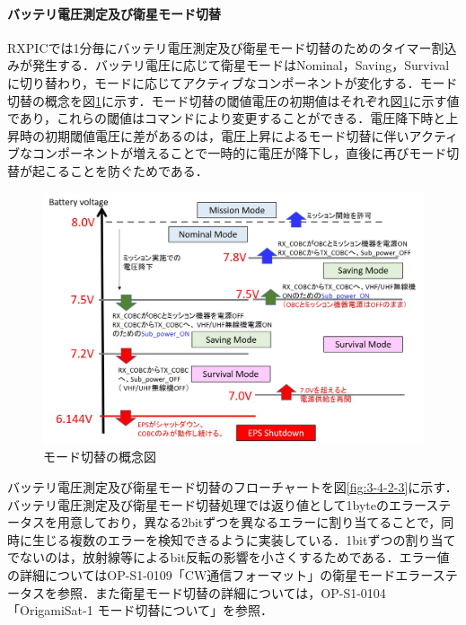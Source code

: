 \paragraph{バッテリ電圧測定及び衛星モード切替}
RXPICでは1分毎にバッテリ電圧測定及び衛星モード切替のためのタイマー割込みが発生する．バッテリ電圧に応じて衛星モードはNominal，Saving，Survivalに切り替わり，モードに応じてアクティブなコンポーネントが変化する．モード切替の概念を図\ref{fig:3-4-2-2}に示す．モード切替の閾値電圧の初期値はそれぞれ図\ref{fig:3-4-2-2}に示す値であり，これらの閾値はコマンドにより変更することができる．電圧降下時と上昇時の初期閾値電圧に差があるのは，電圧上昇によるモード切替に伴いアクティブなコンポーネントが増えることで一時的に電圧が降下し，直後に再びモード切替が起こることを防ぐためである．
\begin{figure}[H]
	\centering
	\includegraphics[scale=0.6]{03/fig/3-4-2-2.jpg}
	\caption{モード切替の概念図}
	\label{fig:3-4-2-2}
\end{figure}
バッテリ電圧測定及び衛星モード切替のフローチャートを図\ref{fig:3-4-2-3}に示す．
バッテリ電圧測定及び衛星モード切替処理では返り値として1byteのエラーステータスを用意しており，異なる2bitずつを異なるエラーに割り当てることで，同時に生じる複数のエラーを検知できるように実装している．1bitずつの割り当てでないのは，放射線等によるbit反転の影響を小さくするためである．エラー値の詳細についてはOP-S1-0109「CW通信フォーマット」の衛星モードエラーステータスを参照．また衛星モード切替の詳細については，OP-S1-0104「OrigamiSat-1 モード切替について」を参照．
